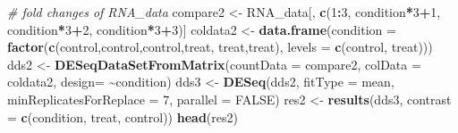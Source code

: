 \documentclass[
]{article}
\newenvironment{Shaded}{\begin{snugshade}}{\end{snugshade}}
\newcommand{\AttributeTok}[1]{\textcolor[rgb]{0.13,0.29,0.53}{#1}}
\newcommand{\CommentTok}[1]{\textcolor[rgb]{0.56,0.35,0.01}{\textit{#1}}}
\newcommand{\ConstantTok}[1]{\textcolor[rgb]{0.56,0.35,0.01}{#1}}
\newcommand{\DecValTok}[1]{\textcolor[rgb]{0.00,0.00,0.81}{#1}}
\newcommand{\FunctionTok}[1]{\textcolor[rgb]{0.13,0.29,0.53}{\textbf{#1}}}
\newcommand{\NormalTok}[1]{#1}
\newcommand{\OtherTok}[1]{\textcolor[rgb]{0.56,0.35,0.01}{#1}}
\newcommand{\SpecialCharTok}[1]{\textcolor[rgb]{0.81,0.36,0.00}{\textbf{#1}}}
\newcommand{\StringTok}[1]{\textcolor[rgb]{0.31,0.60,0.02}{#1}}
\begin{document}
\begin{Shaded}
\begin{Highlighting}[]
  \CommentTok{\# fold changes of RNA\_data}
\NormalTok{  compare2 }\OtherTok{\textless{}{-}}\NormalTok{ RNA\_data[, }\FunctionTok{c}\NormalTok{(}\DecValTok{1}\SpecialCharTok{:}\DecValTok{3}\NormalTok{, condition}\SpecialCharTok{*}\DecValTok{3}\SpecialCharTok{+}\DecValTok{1}\NormalTok{, condition}\SpecialCharTok{*}\DecValTok{3}\SpecialCharTok{+}\DecValTok{2}\NormalTok{, condition}\SpecialCharTok{*}\DecValTok{3}\SpecialCharTok{+}\DecValTok{3}\NormalTok{)]}
\NormalTok{  coldata2 }\OtherTok{\textless{}{-}} \FunctionTok{data.frame}\NormalTok{(}\AttributeTok{condition =} \FunctionTok{factor}\NormalTok{(}\FunctionTok{c}\NormalTok{(}\StringTok{\textquotesingle{}control\textquotesingle{}}\NormalTok{,}\StringTok{\textquotesingle{}control\textquotesingle{}}\NormalTok{,}\StringTok{\textquotesingle{}control\textquotesingle{}}\NormalTok{,}\StringTok{\textquotesingle{}treat\textquotesingle{}}\NormalTok{, }\StringTok{\textquotesingle{}treat\textquotesingle{}}\NormalTok{,}\StringTok{\textquotesingle{}treat\textquotesingle{}}\NormalTok{), }\AttributeTok{levels =} \FunctionTok{c}\NormalTok{(}\StringTok{\textquotesingle{}control\textquotesingle{}}\NormalTok{, }\StringTok{\textquotesingle{}treat\textquotesingle{}}\NormalTok{)))}
\NormalTok{  dds2 }\OtherTok{\textless{}{-}} \FunctionTok{DESeqDataSetFromMatrix}\NormalTok{(}\AttributeTok{countData =}\NormalTok{ compare2, }\AttributeTok{colData =}\NormalTok{ coldata2, }\AttributeTok{design=} \SpecialCharTok{\textasciitilde{}}\NormalTok{condition)}
\NormalTok{  dds3 }\OtherTok{\textless{}{-}} \FunctionTok{DESeq}\NormalTok{(dds2, }\AttributeTok{fitType =} \StringTok{\textquotesingle{}mean\textquotesingle{}}\NormalTok{, }\AttributeTok{minReplicatesForReplace =} \DecValTok{7}\NormalTok{, }\AttributeTok{parallel =} \ConstantTok{FALSE}\NormalTok{)}
\NormalTok{  res2 }\OtherTok{\textless{}{-}} \FunctionTok{results}\NormalTok{(dds3, }\AttributeTok{contrast =} \FunctionTok{c}\NormalTok{(}\StringTok{\textquotesingle{}condition\textquotesingle{}}\NormalTok{, }\StringTok{\textquotesingle{}treat\textquotesingle{}}\NormalTok{, }\StringTok{\textquotesingle{}control\textquotesingle{}}\NormalTok{))}
  \FunctionTok{head}\NormalTok{(res2)}


\end{Highlighting}
\end{Shaded}
\end{document}
